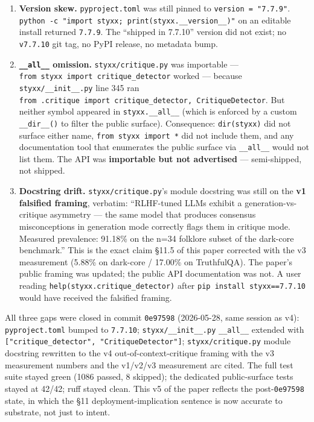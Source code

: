 \documentclass[
]{article}
\begin{document}
\begin{enumerate}
\def\labelenumi{\arabic{enumi}.}
\item
  \textbf{Version skew.} \texttt{pyproject.toml} was still pinned to
  \texttt{version\ =\ "7.7.9"}.
  \texttt{python\ -c\ "import\ styxx;\ print(styxx.\_\_version\_\_)"} on
  an editable install returned \texttt{7.7.9}. The ``shipped in 7.7.10''
  version did not exist; no \texttt{v7.7.10} git tag, no PyPI release,
  no metadata bump.
\item
  \textbf{\texttt{\_\_all\_\_} omission.} \texttt{styxx/critique.py} was
  importable --- \texttt{from\ styxx\ import\ critique\_detector} worked
  --- because \texttt{styxx/\_\_init\_\_.py} line 345 ran
  \texttt{from\ .critique\ import\ critique\_detector,\ CritiqueDetector}.
  But neither symbol appeared in \texttt{styxx.\_\_all\_\_} (which is
  enforced by a custom \texttt{\_\_dir\_\_()} to filter the public
  surface). Consequence: \texttt{dir(styxx)} did not surface either
  name, \texttt{from\ styxx\ import\ *} did not include them, and any
  documentation tool that enumerates the public surface via
  \texttt{\_\_all\_\_} would not list them. The API was
  \textbf{importable but not advertised} --- semi-shipped, not shipped.
\item
  \textbf{Docstring drift.} \texttt{styxx/critique.py}'s module
  docstring was still on the \textbf{v1 falsified framing}, verbatim:
  ``RLHF-tuned LLMs exhibit a generation-vs-critique asymmetry --- the
  same model that produces consensus misconceptions in generation mode
  correctly flags them in critique mode. Measured prevalence: 91.18\% on
  the n=34 folklore subset of the dark-core benchmark.'' This is the
  exact claim §11.5 of this paper corrected with the v3 measurement
  (5.88\% on dark-core / 17.00\% on TruthfulQA). The paper's public
  framing was updated; the public API documentation was not. A user
  reading \texttt{help(styxx.critique\_detector)} after
  \texttt{pip\ install\ styxx==7.7.10} would have received the falsified
  framing.
\end{enumerate}

All three gaps were closed in commit \texttt{0e97598} (2026-05-28, same
session as v4): \texttt{pyproject.toml} bumped to \texttt{7.7.10};
\texttt{styxx/\_\_init\_\_.py} \texttt{\_\_all\_\_} extended with
\texttt{{[}"critique\_detector",\ "CritiqueDetector"{]}};
\texttt{styxx/critique.py} module docstring rewritten to the v4
out-of-context-critique framing with the v3 measurement numbers and the
v1/v2/v3 measurement arc cited. The full test suite stayed green (1086
passed, 8 skipped); the dedicated public-surface tests stayed at 42/42;
ruff stayed clean. This v5 of the paper reflects the
post-\texttt{0e97598} state, in which the §11 deployment-implication
sentence is now accurate to substrate, not just to intent.
\end{document}
